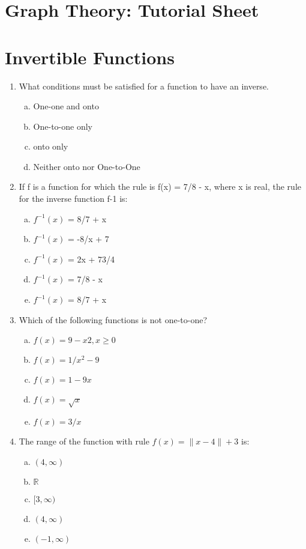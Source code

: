 \documentclass[]{article}
\begin{document}
\section*{Graph Theory: Tutorial Sheet}

\section*{Invertible Functions}

\begin{enumerate}
    \item What conditions must be satisfied for a function to have an inverse.
\begin{enumerate}[(a)]
\item One-one and onto
\item One-to-one only
\item onto only
\item Neither onto nor One-to-One 
\end{enumerate}


\item If f is a function for which the rule is f(x) = 7/8  - x, where x is real, the rule for the inverse function f-1 is:
\begin{enumerate}[(a)]
\item	$f^{-1}(x)$ = 8/7 + x
\item 	$f^{-1}(x)$ = -8/x + 7 
\item 	$f^{-1}(x)$ = 2x + 73/4 
\item 	$f^{-1}(x)$ = 7/8 - x %
\item 	$f^{-1}(x)$ = 8/7 + x
\end{enumerate}

\item Which of the following functions is not one-to-one?
\begin{enumerate}[(a)]
\item	$f(x) = 9 - x2, x \geq 0$
\item 	$f(x) = 1/x^2  - 9$ %
\item 	$f(x) = 1 -9x$
\item 	$f(x) = \sqrt{x}$
\item	$f(x) = 3/x$
\end{enumerate}

\item 
The range of the function with rule $f(x) = \|x - 4\| + 3$ is:
\begin{enumerate}[(a)]
\item	$(4, \infty)$
\item	$\mathbb{R}$
\item 	$[3, \infty)$ %
\item 	$(4, \infty)$
\item	$(-1, \infty)$
\end{enumerate}



\end{enumerate}
\end{document}
